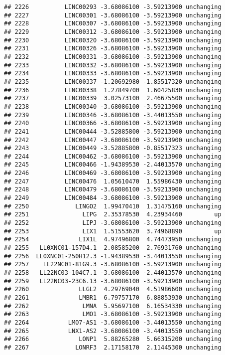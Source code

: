 \documentclass[]{article}
\begin{document}
\begin{verbatim}
## 2226          LINC00293 -3.68086100 -3.59213900 unchanging
## 2227          LINC00301 -3.68086100 -3.59213900 unchanging
## 2228          LINC00307 -3.68086100 -3.59213900 unchanging
## 2229          LINC00312 -3.68086100 -3.59213900 unchanging
## 2230          LINC00320 -3.68086100 -3.59213900 unchanging
## 2231          LINC00326 -3.68086100 -3.59213900 unchanging
## 2232          LINC00331 -3.68086100 -3.59213900 unchanging
## 2233          LINC00332 -3.68086100 -3.59213900 unchanging
## 2234          LINC00333 -3.68086100 -3.59213900 unchanging
## 2235          LINC00337 -1.20692980 -1.85517320 unchanging
## 2236          LINC00338  1.27849700  1.60425830 unchanging
## 2237          LINC00339  3.02573100  2.46675500 unchanging
## 2238          LINC00340 -3.68086100 -3.59213900 unchanging
## 2239          LINC00346 -3.68086100 -3.44013550 unchanging
## 2240          LINC00366 -3.68086100 -3.59213900 unchanging
## 2241          LINC00444 -3.52885800 -3.59213900 unchanging
## 2242          LINC00447 -3.68086100 -3.59213900 unchanging
## 2243          LINC00449 -3.52885800 -0.85517323 unchanging
## 2244          LINC00462 -3.68086100 -3.59213900 unchanging
## 2245          LINC00466 -1.94389530 -2.44013570 unchanging
## 2246          LINC00469 -3.68086100 -3.59213900 unchanging
## 2247          LINC00476  1.05610470  1.55986430 unchanging
## 2248          LINC00479 -3.68086100 -3.59213900 unchanging
## 2249          LINC00484 -3.68086100 -3.59213900 unchanging
## 2250             LINGO2  1.99470410  1.31475160 unchanging
## 2251               LIPG  2.35378530  4.23934460         up
## 2252               LIPJ -3.68086100 -3.59213900 unchanging
## 2253               LIX1  1.51553620  3.74968890         up
## 2254              LIX1L  4.97496800  4.74473950 unchanging
## 2255   LL0XNC01-157D4.1  2.08585200  2.76931760 unchanging
## 2256  LL0XNC01-250H12.3 -1.94389530 -3.44013550 unchanging
## 2257    LL22NC01-81G9.3 -3.68086100 -3.59213900 unchanging
## 2258   LL22NC03-104C7.1 -3.68086100 -2.44013570 unchanging
## 2259   LL22NC03-23C6.13 -3.68086100 -3.59213900 unchanging
## 2260              LLGL2  4.29769040  4.51986600 unchanging
## 2261              LMBR1  6.79757170  6.88853930 unchanging
## 2262               LMNA  5.95697100  6.16534330 unchanging
## 2263               LMO1 -3.68086100 -3.59213900 unchanging
## 2264           LMO7-AS1 -3.68086100 -3.44013550 unchanging
## 2265           LNX1-AS2 -3.68086100 -3.44013550 unchanging
## 2266              LONP1  5.88265280  5.66315200 unchanging
## 2267             LONRF3  2.17158170  2.11445300 unchanging

\end{verbatim}
\end{document}

